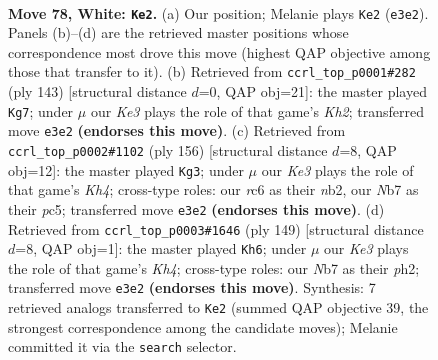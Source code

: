 \documentclass[11pt]{article}
\begin{document}
\clearpage

\begin{figure}[p]\centering
\begin{subfigure}{0.46\textwidth}\centering
\resizebox{\linewidth}{!}{%
\newchessgame
\chessboard[
  setfen={7k/1NP5/2r5/8/8/4K1B1/8/8 w - - 69 78},
  showmover=false,
  pgfstyle=straightmove, color=movearrow, markmove={e3-e2}
]}
\caption{}
\end{subfigure}\hfill
\begin{subfigure}{0.46\textwidth}\centering
\resizebox{\linewidth}{!}{%
\newchessgame
\chessboard[
  setfen={8/7k/3n4/3b4/1R6/1p6/5K2/8 b - - 17 72},
  showmover=false,
  pgfstyle=straightmove, color=movearrow, markmove={h7-g7}
]}
\caption{}
\end{subfigure}
\\[4pt]
\begin{subfigure}{0.46\textwidth}\centering
\resizebox{\linewidth}{!}{%
\newchessgame
\chessboard[
  setfen={8/4k3/B7/2p5/2P4K/8/1n6/8 w - - 9 79},
  showmover=false,
  pgfstyle=straightmove, color=movearrow, markmove={h4-g3}
]}
\caption{}
\end{subfigure}\hfill
\begin{subfigure}{0.46\textwidth}\centering
\resizebox{\linewidth}{!}{%
\newchessgame
\chessboard[
  setfen={6b1/8/8/7k/8/3R4/pK5P/8 b - - 13 75},
  showmover=false,
  pgfstyle=straightmove, color=movearrow, markmove={h5-h6}
]}
\caption{}
\end{subfigure}
\caption{\textbf{Move 78, White: \texttt{Ke2}.} (a) Our position; Melanie plays \texttt{Ke2} (\texttt{e3e2}). Panels (b)--(d) are the retrieved master positions whose correspondence most drove this move (highest QAP objective among those that transfer to it). (b) Retrieved from \texttt{ccrl\_top\_p0001\#282} (ply 143) [structural distance $d$=0, QAP obj=21]: the master played \texttt{Kg7}; under $\mu$ our \emph{Ke3} plays the role of that game's \emph{Kh2}; transferred move \texttt{e3e2} \textbf{(endorses this move)}. (c) Retrieved from \texttt{ccrl\_top\_p0002\#1102} (ply 156) [structural distance $d$=8, QAP obj=12]: the master played \texttt{Kg3}; under $\mu$ our \emph{Ke3} plays the role of that game's \emph{Kh4}; cross-type roles: our \emph{r}c6 as their \emph{n}b2, our \emph{N}b7 as their \emph{p}c5; transferred move \texttt{e3e2} \textbf{(endorses this move)}. (d) Retrieved from \texttt{ccrl\_top\_p0003\#1646} (ply 149) [structural distance $d$=8, QAP obj=1]: the master played \texttt{Kh6}; under $\mu$ our \emph{Ke3} plays the role of that game's \emph{Kh4}; cross-type roles: our \emph{N}b7 as their \emph{p}h2; transferred move \texttt{e3e2} \textbf{(endorses this move)}. Synthesis: 7 retrieved analogs transferred to \texttt{Ke2} (summed QAP objective 39, the strongest correspondence among the candidate moves); Melanie committed it via the \texttt{search} selector.}
\label{fig:thought-m154}
\end{figure}
\end{document}
